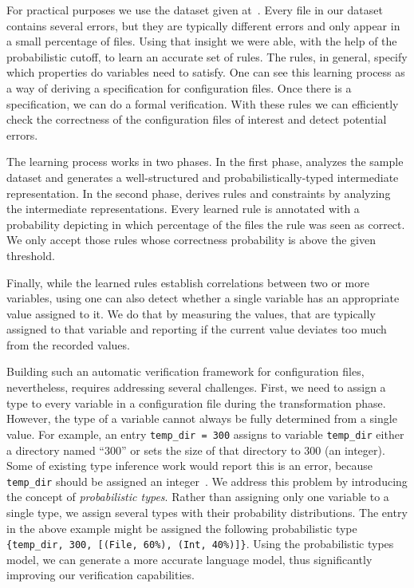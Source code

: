 For practical purposes we use the dataset given at~\cite{configdataset}. 
Every file in our dataset contains several errors, 
but they are typically different errors and only appear 
in a small percentage of files. Using that insight we were able, with the help of the probabilistic cutoff, to learn an
accurate set of rules. The rules, in general, specify which properties do variables need to satisfy. One can see this learning process as a
way of deriving  
a specification for configuration files.  Once there is a specification, we can do a formal verification. With these 
rules we can efficiently check the correctness of the configuration files
of interest and detect potential errors.

The learning process works in two phases. In the first phase, 
\app analyzes the sample dataset and generates a 
well-structured and probabilistically-typed 
intermediate representation. 
In the second phase, \app derives rules and constraints by analyzing
the intermediate representations.  Every learned rule is annotated with a probability depicting in
which percentage of the files the rule was seen as correct. We only accept those rules whose 
correctness probability is above the given threshold. 

Finally, while the learned rules establish correlations between two or more variables, using \app one can also detect whether a
single variable has an appropriate value assigned to it. We do that by measuring the values, that are typically assigned to that variable 
and reporting if the current value deviates too much from the recorded values.

Building such an automatic verification framework for
configuration files, nevertheless, requires addressing several challenges. 
First, we need to assign a type to every variable in a configuration file during the transformation phase.
However,
the type of a variable cannot always be fully determined 
from a single value. 
For example, an entry {\tt temp\_dir = 300} assigns to variable {\tt temp\_dir} either a directory named ``300'' or sets the size of that directory to 300 (an integer).
Some of existing type inference 
work would report this is an error, because {\tt temp\_dir} should be assigned
an integer~\cite{zhang14encore}. We address this problem by introducing the concept of
{\emph{probabilistic types}}.
Rather than assigning only one variable to a single type, 
we assign several types with their probability distributions. 
The entry in the above example might be assigned 
the following probabilistic type
{\tt \{temp\_dir, 300, [(File, 60\%), (Int, 40\%)]\}}.
Using the probabilistic types model,
we can generate a more accurate language model,
thus significantly improving our verification capabilities.


